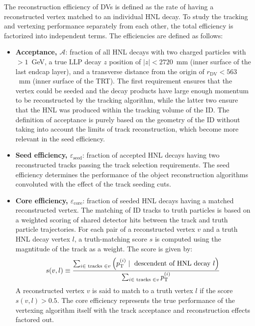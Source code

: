The reconstruction efficiency of DVs is defined as the rate of having a reconstructed vertex matched to an individual HNL decay. To study the tracking and vertexing performance separately from each other, the total efficiency is factorized into independent terms. The efficiencies are defined as follows:
\begin{itemize}
    \item \textbf{Acceptance, $\mathcal{A}$}: fraction of all HNL decays with two charged particles with \pT $>1$~GeV, a true LLP decay $z$ position of $|z|<2720$~mm (inner surface of the last endcap layer), and a transverse distance from the origin of $r_\mathrm{DV}<563$~mm (inner surface of the TRT). The first requirement ensures that the vertex could be seeded and the decay products have large enough momentum to be reconstructed by the tracking algorithm, while the latter two ensure that the HNL was produced within the tracking volume of the ID. The definition of acceptance is purely based on the geometry of the ID without taking into account the limits of track reconstruction, which become more relevant in the seed efficiency.
    \item \textbf{Seed efficiency, $\varepsilon_\mathrm{seed}$}: fraction of accepted HNL decays having two reconstructed tracks passing the track selection requirements. The seed efficiency determines the performance of the object reconstruction algorithms convoluted with the effect of the track seeding cuts.
    \item \textbf{Core efficiency, $\varepsilon_\mathrm{core}$}: fraction of seeded HNL decays having a matched reconstructed vertex.
    The matching of ID tracks to truth particles is based on a weighted scoring of shared detector hits between the track and truth particle trajectories. For each pair of a reconstructed vertex $v$ and a truth HNL decay vertex $l$, a truth-matching score $s$ is computed using the magntitude of the track \pT as a weight. The score is given by:
    \begin{equation}
        s(v, l) \equiv \frac{\sum_{i \in \text { tracks } \in v}\left(p_\mathrm{T}^{(i)} \mid \text { descendent of HNL decay } l\right)}{\sum_{i \in \text { tracks } \in v} p_\mathrm{T}^{(i)}}
    \end{equation}
    A reconstructed vertex $v$ is said to match to a truth vertex $l$ if the score $s(v,l)>0.5$. The core efficiency represents the true performance of the vertexing algorithm itself with the track acceptance and reconstruction effects factored out.
\end{itemize}

